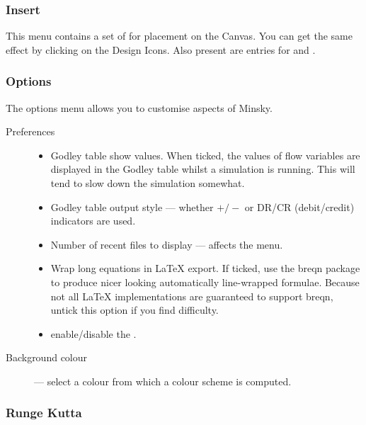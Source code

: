 \subsubsection{Insert}
\label{Insert}

This menu contains a set of  for placement on the Canvas. You can get the same
effect by clicking on the Design Icons. Also present are entries for
 and .


\subsubsection{Options}
\label{Options}

The options menu allows you to customise aspects of Minsky.

\begin{description}
\item[Preferences]\mbox{}

\begin{itemize}
\item Godley table show values. When ticked, the values of flow
variables are displayed in the Godley table whilst a simulation is
running. This will tend to slow down the simulation somewhat.
\item Godley table output style --- whether $+/-$ or DR/CR (debit/credit)
indicators are used.
\item Number of recent files to display --- affects the  menu.
\item\label{wrap-equations} Wrap long equations in LaTeX export. If ticked, use the breqn
package to produce nicer looking automatically line-wrapped
formulae. Because not all LaTeX implementations are guaranteed to
support breqn, untick this option if you find difficulty.
\item{} enable/disable the .
\end{itemize}

\item[Background colour] --- select a colour from which a colour scheme
is computed.

\end{description}

\subsubsection{Runge Kutta}
\label{RungeKutta}

